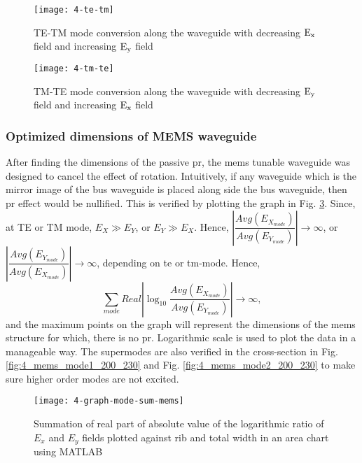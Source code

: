 \documentclass[../report.tex]{subfiles}
\begin{document}
\begin{figure}[H] %
	\centering
	\texttt{[image: 4-te-tm]}
	\caption{TE-TM mode conversion along the waveguide with decreasing $\mathrm{E_{x}}$ field and increasing $\mathrm{E_{y}}$ field} 
	\label{fig:4_te_tm}
\end{figure}

\begin{figure}[H] %
	\centering
	\texttt{[image: 4-tm-te]}
	\caption{TM-TE mode conversion along the waveguide with decreasing $\mathrm{E_{y}}$ field and increasing $\mathrm{E_{x}}$ field}
	\label{fig:4_tm_te}
\end{figure}

\subsubsection{Optimized dimensions of MEMS waveguide}
After finding the dimensions of the passive \gls{pr}, the \gls{mems} tunable waveguide was designed to cancel the effect of rotation. Intuitively, if any waveguide which is the mirror image of the bus waveguide is placed along side the bus waveguide, then \gls{pr} effect would be nullified. This is verified by plotting the graph in Fig. \ref{fig:4_graph_mode_sum_mems}. Since, at TE or TM mode, $E_X \gg E_Y$, or $E_Y \gg E_X$. Hence, $\left|\dfrac {Avg(E_{X_{mode}})} {Avg(E_{Y_{mode}})}\right| \rightarrow \infty$, or $\left|\dfrac {Avg(E_{Y_{mode}})} {Avg(E_{X_{mode}})}\right| \rightarrow \infty$, depending on \gls{te} or \gls{tm}-mode.
Hence, 
\begin{equation}\label{eq:mems_dim_eq}
\sum _{mode}Real\left| \log _{10}\dfrac {Avg(E_{X_{mode}})} {Avg(E_{Y_{mode}})}\right| \rightarrow \infty,
\end{equation}
and the maximum points on the graph will represent the dimensions of the \gls{mems} structure for which, there is no \gls{pr}. Logarithmic scale is used to plot the data in a manageable way. The supermodes are also verified in the cross-section in Fig. \ref{fig:4_mems_mode1_200_230} and Fig. \ref{fig:4_mems_mode2_200_230} to make sure higher order modes are not excited.

\begin{figure}[H] %
	\centering
	\texttt{[image: 4-graph-mode-sum-mems]}
	\caption{Summation of real part of absolute value of the logarithmic ratio of $E_x$ and $E_y$ fields plotted against rib and total width in an area chart using MATLAB}
	\label{fig:4_graph_mode_sum_mems}
\end{figure}
		
\end{document}
